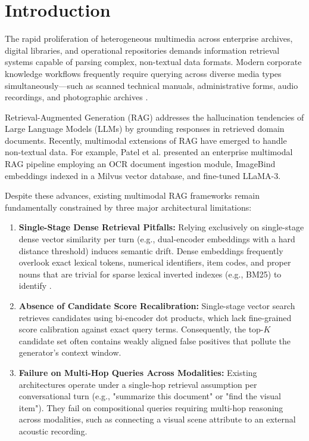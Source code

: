\documentclass[conference]{IEEEtran}
\begin{document}
\section{Introduction}

The rapid proliferation of heterogeneous multimedia across enterprise archives, digital libraries, and operational repositories demands information retrieval systems capable of parsing complex, non-textual data formats. Modern corporate knowledge workflows frequently require querying across diverse media types simultaneously—such as scanned technical manuals, administrative forms, audio recordings, and photographic archives \cite{jing2024llmvectordb}.

Retrieval-Augmented Generation (RAG) \cite{lewis2020rag} addresses the hallucination tendencies of Large Language Models (LLMs) by grounding responses in retrieved domain documents. Recently, multimodal extensions of RAG have emerged to handle non-textual data. For example, Patel et al. \cite{patel2025multimodal} presented an enterprise multimodal RAG pipeline employing an OCR document ingestion module, ImageBind embeddings indexed in a Milvus vector database, and fine-tuned LLaMA-3.

Despite these advances, existing multimodal RAG frameworks remain fundamentally constrained by three major architectural limitations:

\begin{enumerate}
    \item \textbf{Single-Stage Dense Retrieval Pitfalls:} Relying exclusively on single-stage dense vector similarity per turn (e.g., dual-encoder embeddings with a hard distance threshold) induces semantic drift. Dense embeddings frequently overlook exact lexical tokens, numerical identifiers, item codes, and proper nouns that are trivial for sparse lexical inverted indexes (e.g., BM25) to identify \cite{karpukhin2020dpr}.
    \item \textbf{Absence of Candidate Score Recalibration:} Single-stage vector search retrieves candidates using bi-encoder dot products, which lack fine-grained score calibration against exact query terms. Consequently, the top-$K$ candidate set often contains weakly aligned false positives that pollute the generator's context window.
    \item \textbf{Failure on Multi-Hop Queries Across Modalities:} Existing architectures operate under a single-hop retrieval assumption per conversational turn (e.g., "summarize this document" or "find the visual item"). They fail on compositional queries requiring multi-hop reasoning across modalities, such as connecting a visual scene attribute to an external acoustic recording.
\end{enumerate}
\end{document}
